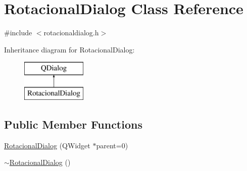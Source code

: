 \hypertarget{class_rotacional_dialog}{\section{Rotacional\-Dialog Class Reference}
\label{class_rotacional_dialog}
}


{\ttfamily \#include $<$rotacionaldialog.\-h$>$}

Inheritance diagram for Rotacional\-Dialog\-:\begin{figure}[H]
\begin{center}
\leavevmode
\includegraphics[height=2.000000cm]{class_rotacional_dialog}
\end{center}
\end{figure}
\subsection*{Public Member Functions}
\begin{DoxyCompactItemize}
\item 
\hyperlink{class_rotacional_dialog_a4dcdf1bfce49ef30fe3fca1c0e2057ae}{Rotacional\-Dialog} (Q\-Widget $\ast$parent=0)
\item 
\hyperlink{class_rotacional_dialog_a38f546b6372f9a6f669096fb5d4fa16b}{$\sim$\-Rotacional\-Dialog} ()
\end{DoxyCompactItemize}


